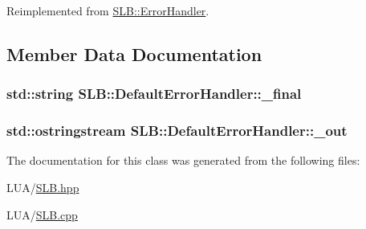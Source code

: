 Reimplemented from \hyperlink{classSLB_1_1ErrorHandler_a81782d504556ac90780ac40d89cbad9a}{S\+L\+B\+::\+Error\+Handler}.



\subsection{Member Data Documentation}
\subsubsection[{\texorpdfstring{\+\_\+final}{_final}}]{\setlength{\rightskip}{0pt plus 5cm}std\+::string S\+L\+B\+::\+Default\+Error\+Handler\+::\+\_\+final\hspace{0.3cm}{\ttfamily [private]}}\hypertarget{classSLB_1_1DefaultErrorHandler_a2df7d031a80cda55bf2be125f4d03033}{}\label{classSLB_1_1DefaultErrorHandler_a2df7d031a80cda55bf2be125f4d03033}
\subsubsection[{\texorpdfstring{\+\_\+out}{_out}}]{\setlength{\rightskip}{0pt plus 5cm}std\+::ostringstream S\+L\+B\+::\+Default\+Error\+Handler\+::\+\_\+out\hspace{0.3cm}{\ttfamily [private]}}\hypertarget{classSLB_1_1DefaultErrorHandler_a11b0c953d8811a5fe00cab385c14e4b1}{}\label{classSLB_1_1DefaultErrorHandler_a11b0c953d8811a5fe00cab385c14e4b1}


The documentation for this class was generated from the following files\+:\begin{DoxyCompactItemize}
\item 
L\+U\+A/\hyperlink{SLB_8hpp}{S\+L\+B.\+hpp}\item 
L\+U\+A/\hyperlink{SLB_8cpp}{S\+L\+B.\+cpp}\end{DoxyCompactItemize}
